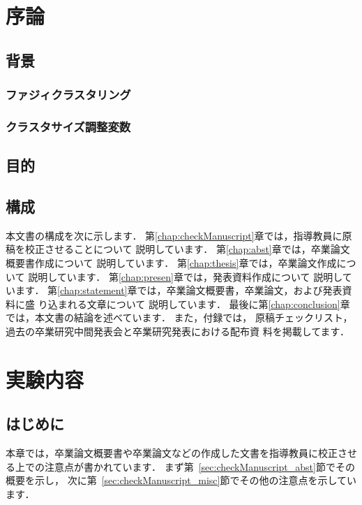 \documentclass[a4j,12pt,dvipdfmx,oneside]{jsbook}
\theoremstyle{definition}
\begin{document}
\pagestyle{headings}
\def\thepage{\roman{page}}

\tableofcontents
\listoffigures
\listoftables
\newpage
\pagestyle{myheadings}
%
%
%
\chapter{序論}
\def\thepage{\arabic{page}}
\setcounter{page}{1}
\label{chap:first}
%
%
%
\section{背景}\label{sec:background}
%
%
\subsection{ファジィクラスタリング}\label{subsec:fuzzy_clustering}
%
%
\subsection{クラスタサイズ調整変数}\label{subsec:cluster_adjust_var}
%
%
\section{目的}\label{sec:purpose}
%
%
%

%
%
%
\section{構成}\label{sec:contents}
%
%
%
本文書の構成を次に示します．
第\ref{chap:checkManuscript}章では，指導教員に原稿を校正させることについて
説明しています．
第\ref{chap:abst}章では，卒業論文概要書作成について
説明しています．
第\ref{chap:thesis}章では，卒業論文作成について
説明しています．
第\ref{chap:presen}章では，発表資料作成について
説明しています．
第\ref{chap:statement}章では，卒業論文概要書，卒業論文，および発表資料に盛
り込まれる文章について
説明しています．
最後に第\ref{chap:conclusion}章では，本文書の結論を述べています．
また，付録では，
原稿チェックリスト，過去の卒業研究中間発表会と卒業研究発表における配布資
料を掲載してます．
%
%
%
\chapter{実験内容}\label{chap:}
%
%
%
\section{はじめに}\label{sec:checkManuscript_intro}
本章では，卒業論文概要書や卒業論文などの作成した文書を指導教員に校正させ
る上での注意点が書かれています．
まず第~\ref{sec:checkManuscript_abst}節でその概要を示し，
次に第~\ref{sec:checkManuscript_misc}節でその他の注意点を示しています．
%
%
%
\end{document}
